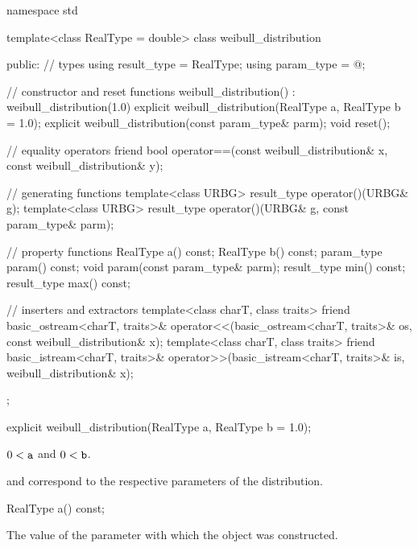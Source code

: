 %
%
\begin{codeblock}
namespace std {
  template<class RealType = double>
  class weibull_distribution {
  public:
    // types
    using result_type = RealType;
    using param_type  = @\unspec@;

    // constructor and reset functions
    weibull_distribution() : weibull_distribution(1.0) {}
    explicit weibull_distribution(RealType a, RealType b = 1.0);
    explicit weibull_distribution(const param_type& parm);
    void reset();

    // equality operators
    friend bool operator==(const weibull_distribution& x, const weibull_distribution& y);

    // generating functions
    template<class URBG>
      result_type operator()(URBG& g);
    template<class URBG>
      result_type operator()(URBG& g, const param_type& parm);

    // property functions
    RealType a() const;
    RealType b() const;
    param_type param() const;
    void param(const param_type& parm);
    result_type min() const;
    result_type max() const;

    // inserters and extractors
    template<class charT, class traits>
      friend basic_ostream<charT, traits>&
        operator<<(basic_ostream<charT, traits>& os, const weibull_distribution& x);
    template<class charT, class traits>
      friend basic_istream<charT, traits>&
        operator>>(basic_istream<charT, traits>& is, weibull_distribution& x);
  };
}
\end{codeblock}

%
\begin{itemdecl}
explicit weibull_distribution(RealType a, RealType b = 1.0);
\end{itemdecl}%

\begin{itemdescr}
\pnum
\expects
$0 < \tcode{a}$ and $0 < \tcode{b}$.

\pnum
\remarks
{} and 
correspond to the respective parameters of the distribution.
\end{itemdescr}

%
\begin{itemdecl}
RealType a() const;
\end{itemdecl}

\begin{itemdescr}
\pnum
\returns
The value of the  parameter
 with which the object was constructed.
\end{itemdescr}

